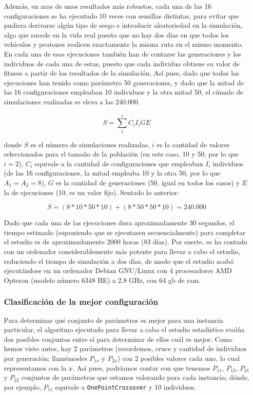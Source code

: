 Además, en aras de unos resultados más robustos, cada una de las 16 configuraciones se ha ejecutado 10 veces con semillas distintas, para evitar que pudiera derivarse algún tipo de sesgo e introducir aleatoriedad en la simulación, algo que sucede en la vida real puesto que no hay dos días en que todos los vehículos y peatones realicen exactamente la misma ruta en el mismo momento. En cada una de esas ejecuciones también han de contarse las generaciones y los individuos de cada una de estas, puesto que cada individuo obtiene su valor de fitness a partir de los resultados de la simulación. Así pues, dado que todas las ejecuciones han tenido como parámetro 50 generaciones, y dado que la mitad de las 16 configuraciones empleaban 10 individuos y la otra mitad 50, el cúmulo de simulaciones realizadas se eleva a las 240.000.

$$
S = \sum_{1}^{i} C_i  I_i G E
$$

donde $S$ es el número de simulaciones realizadas, $i$ es la cantidad de valores seleccionados para el tamaño de la población (en este caso, 10 y 50, por lo que $i=2$), $C_i$ equivale a la cantidad de configuraciones que empleaban $I_i$ individuos (de las 16 configuraciones, la mitad empleaba 10 y la otra 50, por lo que $A_1 = A_2 = 8$), $G$ es la cantidad de generaciones (50, igual en todos los casos) y $E$ la de ejecuciones (10, es un valor fijo). Sentado lo anterior:

$$
S = (8*10*50*10) + (8*50*50*10) = 240.000
$$

Dado que cada una de las ejecuciones dura aproximadamente 30 segundos, el tiempo estimado (suponiendo que se ejecutasen secuencialmente) para completar el estudio es de aproximadamente 2000 horas (83 días). Por suerte, se ha contado con un ordenador considerablemente más potente para llevar a cabo el estudio, reduciendo el tiempo de simulación a dos días, de modo que el estudio acabó ejecutándose en un ordenador Debian GNU/Linux con 4 procesadores AMD\textregistered{} Opteron\texttrademark{} (modelo número 6348 HE) a 2.8 GHz, con 64 gb de ram.

\subsubsection{Clasificación de la mejor configuración}

Para determinar qué conjunto de parámetros es mejor para una instancia particular, el algoritmo ejecutado para llevar a cabo el estudio estadístico evalúa dos posibles conjuntos entre sí para determinar de ellos cuál es mejor. Como hemos visto antes, hay 2 parámetros (recordemos, cruce y cantidad de individuos por generación; llamémosles $P_{1x}$ y $P_{2x}$) con 2 posibles valores cada uno, lo cual representamos con la $x$. Así pues, podríamos contar con que tenemos $P_{11}$, $P_{12}$, $P_{21}$ y $P_{22}$ conjuntos de parámetros que estamos valorando para cada instancia; dónde, por ejemplo, $P_{11}$ equivale a \texttt{OnePointCrossover} y 10 individuos. 

